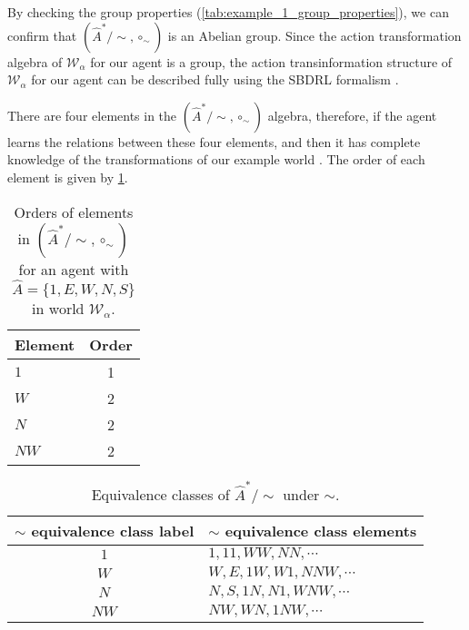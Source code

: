 By checking the group properties (\cref{tab:example_1_group_properties}), we can confirm that $(\hat{A}^{*}/\sim, \circ_{\sim})$ is an Abelian group.
Since the action transformation algebra of $\mathscr{W}_{\alpha}$ for our agent is a group, the action transinformation structure of $\mathscr{W}_{\alpha}$ for our agent can be described fully using the SBDRL formalism .


There are four elements in the $(\hat{A}^{*}/\sim, \circ_{\sim})$ algebra, therefore, if the agent learns the relations between these four elements, and then it has complete knowledge of the transformations of our example world .
The order of each element is given by \cref{tab:example_1_element_orders}.

\begin{table}
    \centering
    \begin{tabular}{l|c}
        \textbf{Element}   & \textbf{Order} \\
        \hline
        $1$     & 1\\
        $W$     & 2\\
        $N$     & 2\\
        $NW$    & 2
    \end{tabular}
    \caption{
    Orders of elements in $(\hat{A}^{*}/\sim, \circ_{\sim})$ for an agent with $\hat{A} = \{1, E, W, N, S \}$ in world $\mathscr{W}_{\alpha}$.
    }
    \label{tab:example_1_element_orders}
\end{table}

\begin{table}[H]
    \centering
    \begin{tabular}{c|l}
        $\sim$ equivalence class label & $\sim$ equivalence class elements\\
        \hline
        $1$         & $1, 11, WW, NN, \cdots$\\
        $W$         & $W, E, 1W, W1, NNW, \cdots$\\
        $N$         & $N, S, 1N, N1, WNW, \cdots$\\
        $NW$        & $NW, WN, 1NW, \cdots$
    \end{tabular}
    \caption{Equivalence classes of $\hat{A}^{*}/\sim$ under $\sim$.}
\end{table}

